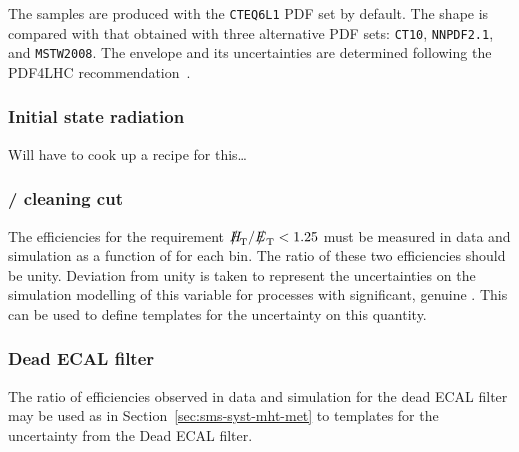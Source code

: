 \newcommand{\lcr}{Left: $\frac{\epsilon_{CTEQ6L1}}{\epsilon_{CT10}}$,
  center: $\frac{\epsilon_{CTEQ6L1}}{\epsilon_{MSTW08}}$, right:
  $\frac{\epsilon_{CTEQ6L1}}{\epsilon_{NNPDF2.1}}$}

The samples are produced with the \verb!CTEQ6L1! PDF set by
default. The shape is compared with that obtained with
three alternative PDF sets: \verb!CT10!, \verb!NNPDF2.1!, and
\verb!MSTW2008!. The envelope and its uncertainties are determined
following the PDF4LHC recommendation~\cite{pdf4lhc}.


\subsubsection{Initial state radiation\label{sec:sms-syst-isr}}
Will have to cook up a recipe for this\ldots


\subsubsection{\texorpdfstring{\mht/\met}{MHT/MET} cleaning cut\label{sec:sms-syst-mht-met}}
The efficiencies for the requirement $\mht/\met < 1.25$ must be measured in 
data and simulation as a function of \mht for each \scalht bin.
The ratio of these two efficiencies should be unity. Deviation from unity is taken
to represent the uncertainties on the simulation modelling of this
variable for processes with significant, genuine \met. This can be used
to define templates for the uncertainty on this quantity.

\subsubsection{Dead ECAL filter\label{sec:sms-syst-dead-ecal}}

The ratio of efficiencies observed in data and simulation for the dead
ECAL filter may be used as in Section~\ref{sec:sms-syst-mht-met} to templates
for the uncertainty from the Dead ECAL filter. 
